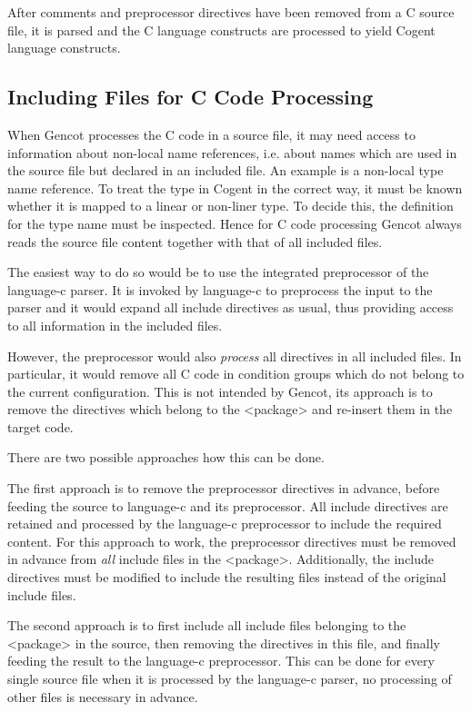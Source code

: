 
After comments and preprocessor directives have been removed from a C source file, it is parsed and
the C language constructs are processed to yield Cogent language constructs. 

\subsection{Including Files for C Code Processing}

When Gencot processes the C code in a source file, it may need access to information about non-local name references, 
i.e. about names which are used in the source file but declared in an included file. 
An example is a non-local type name reference. To treat the type in Cogent in the correct way, it must be known whether
it is mapped to a linear or non-liner type. To decide this, the definition for the type name must be inspected.
Hence for C code processing Gencot always reads the source file content together with that of all included files.

The easiest way to do so would be to use the integrated preprocessor of the language-c parser. It is invoked by
language-c to preprocess the input to the parser and it would expand all include directives as usual, thus providing
access to all information in the included files.

However, the preprocessor would also \textit{process} all directives in all included files. In particular, it would
remove all C code in condition groups which do not belong to the current configuration. This is not intended by Gencot,
its approach is to remove the directives which belong to the <package> and re-insert them in the target code.

There are two possible approaches how this can be done.

The first approach is to remove the preprocessor directives in advance, before feeding the source to language-c and 
its preprocessor. All include directives are retained and processed by the language-c preprocessor to include the
required content. For this approach to work, the preprocessor directives must be removed in advance from \textit{all} 
include files in the <package>. Additionally, the include directives must be modified to include the resulting
files instead of the original include files. 

The second approach is to first include all include files belonging to the <package> in the source, then removing the
directives in this file, and finally feeding the result to the language-c preprocessor. This can be done for every 
single source file when it is processed by the language-c parser, no processing of other files is necessary in advance.

